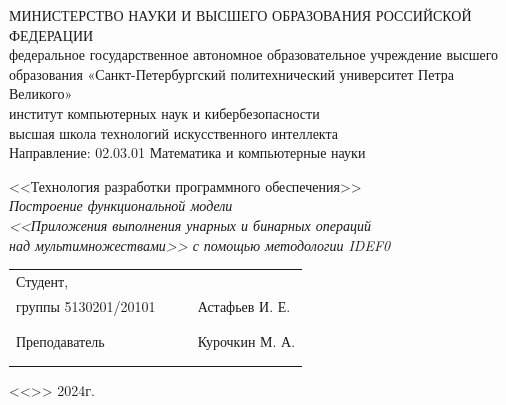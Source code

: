 \documentclass[a4paper, final]{article}
\begin{document}

\begin{center}
\hfill \break
\hfill \break
\normalsize{МИНИСТЕРСТВО НАУКИ И ВЫСШЕГО ОБРАЗОВАНИЯ РОССИЙСКОЙ ФЕДЕРАЦИИ\\
 федеральное государственное автономное образовательное учреждение высшего образования «Санкт-Петербургский политехнический университет Петра Великого»\\[10pt]}
\normalsize{институт компьютерных наук и кибербезопасности}\\[10pt] 
\normalsize{высшая школа технологий искусственного интеллекта}\\[10pt] 
\normalsize{Направление: 02.03.01 Математика и компьютерные науки}\\

\hfill \break
\hfill \break

\large{<<Технология разработки программного обеспечения>>}\\
\large{\textit{Построение функциональной модели}}\\
\large{\textit{<<Приложения выполнения унарных и бинарных операций}}\\
\large{\textit{над мультимножествами>> с помощью методологии IDEF0}}
\hfill \break

\hfill \break
\hfill \break
\end{center}
 
\small{ 
\begin{tabular}{lrrl}
\!\!\!Студент, & \hspace{2cm} & & \\
\!\!\!группы 5130201/20101 & \hspace{2cm} & \underline{\hspace{3cm}} &Астафьев И. Е. \\\\
\!\!\! & \hspace{2cm} & \\
\!\!\!Преподаватель & \hspace{2cm} & \underline{\hspace{3cm}} &  Курочкин М. А. \\\\
&&\hspace{5cm}
\end{tabular}
\begin{flushright}
<<\underline{\hspace{1cm}}>>\underline{\hspace{2.5cm}} 2024г.
\end{flushright}
}
\end{document}
